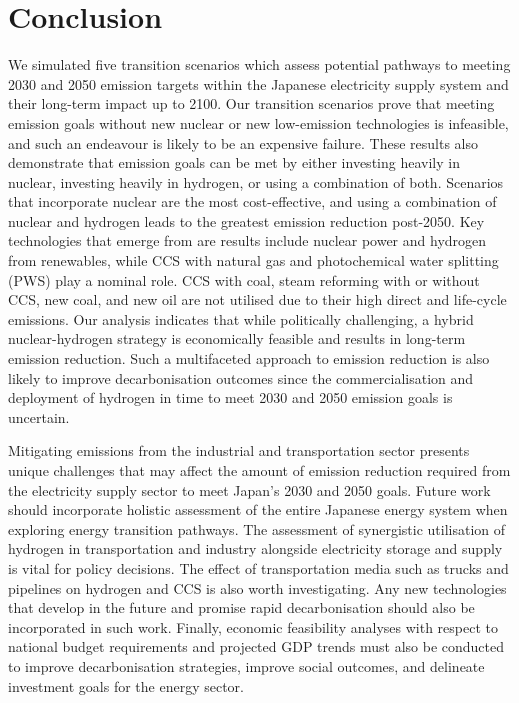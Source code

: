 \section{Conclusion} \label{Conclusion}

We simulated five transition scenarios which assess potential pathways to meeting 2030 and 2050 emission targets within the Japanese electricity supply system and their long-term impact up to 2100. Our transition scenarios prove that meeting emission goals without new nuclear or new low-emission technologies is infeasible, and such an endeavour is likely to be an expensive failure. These results also demonstrate that emission goals can be met by either investing heavily in nuclear, investing heavily in hydrogen, or using a combination of both. Scenarios that incorporate nuclear are the most cost-effective, and using a combination of nuclear and hydrogen leads to the greatest emission reduction post-2050. Key technologies that emerge from are results include nuclear power and hydrogen from renewables, while \gls{CCS} with natural gas and photochemical water splitting (\gls{PWS}) play a nominal role. CCS with coal, steam reforming with or without CCS, new coal, and new oil are not utilised due to their high direct and life-cycle emissions. Our analysis indicates that while politically challenging, a hybrid nuclear-hydrogen strategy is economically feasible and results in long-term emission reduction. Such a multifaceted approach to emission reduction is also likely to improve decarbonisation outcomes since the commercialisation and deployment of hydrogen in time to meet 2030 and 2050 emission goals is uncertain.

Mitigating emissions from the industrial and transportation sector presents unique challenges that may affect the amount of emission reduction required from the electricity supply sector to meet Japan's 2030 and 2050 goals. Future work should incorporate holistic assessment of the entire Japanese energy system when exploring energy transition pathways. The assessment of synergistic utilisation of hydrogen in transportation and industry alongside electricity storage and supply is vital for policy decisions. The effect of transportation media such as trucks and pipelines on hydrogen and CCS is also worth investigating. Any new technologies that develop in the future and promise rapid decarbonisation should also be incorporated in such work. Finally, economic feasibility analyses with respect to national budget requirements and projected GDP trends must also be conducted to improve decarbonisation strategies, improve social outcomes, and delineate investment goals for the energy sector.

